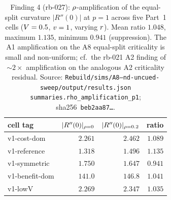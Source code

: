 \begin{table}[t]
  \centering
  \small
  \caption{Finding 4 (rb-027): $\rho$-amplification of the
    equal-split curvature $|R''(0)|$ at $p = 1$ across five Part~1
    cells ($V = 0.5$, $v = 1$, varying $r$). Mean ratio
    $1.048$, maximum $1.135$, minimum $0.941$ (suppression). The A1
    amplification on the A8 equal-split criticality is small and
    non-uniform; cf.\ the rb-021 A2 finding of $\sim\!2\times$
    amplification on the analogous A2 criticality residual. Source:
    \texttt{Rebuild/sims/A8--nd-uncued-sweep/}\allowbreak\texttt{output/results.json}
    \texttt{summaries.rho\_amplification\_p1}; sha256~\texttt{beb2aa87\ldots}.}
  \label{tab:a8-rho-curv-ratio}
  \begin{tabular}{l r r r}
    \toprule
    cell tag & $|R''(0)|_{\rho = 0}$ & $|R''(0)|_{\rho = 0.2}$
      & ratio \\
    \midrule
    v1-cost-dom    & $2.261$  & $2.462$  & $1.089$ \\
    v1-reference   & $1.318$  & $1.496$  & $1.135$ \\
    v1-symmetric   & $1.750$  & $1.647$  & $0.941$ \\
    v1-benefit-dom & $141.0$  & $146.8$  & $1.041$ \\
    v1-lowV        & $2.269$  & $2.347$  & $1.035$ \\
    \bottomrule
  \end{tabular}
\end{table}

